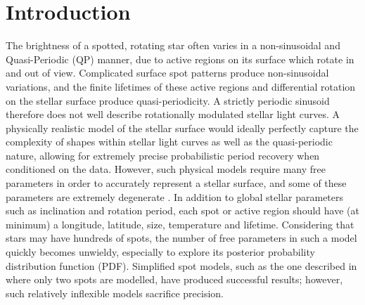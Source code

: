\documentclass[useAMS, usenatbib, preprint, 12pt]{aastex}
\newcommand{\eg}{{\it e.g.}}
\begin{document}
\section{Introduction}

The brightness of a spotted, rotating star often varies in a non-sinusoidal and
Quasi-Periodic (QP) manner, due to active regions on its surface which
rotate in and out of view.
Complicated surface spot patterns produce non-sinusoidal variations,
and the finite lifetimes of these active regions and
differential rotation on the stellar surface produce quasi-periodicity.
A strictly periodic sinusoid therefore does not well describe
rotationally modulated stellar light curves.
A physically realistic model of the stellar surface
would ideally perfectly capture the complexity of shapes
within stellar light curves as well as the quasi-periodic nature, allowing for
extremely precise probabilistic period recovery when conditioned on the data.
However, such physical models require many free parameters in order to
accurately represent a stellar surface, and some of these parameters are
extremely degenerate \citep[\eg][]{Russell1906, Jeffers2009, Kipping2012}.
In addition to global stellar parameters such as inclination and rotation
period, each spot or active region should have (at minimum) a longitude,
latitude, size, temperature and lifetime.
Considering that stars may have hundreds of spots, the number
of free parameters in such a model quickly becomes unwieldy, especially to explore
its posterior probability distribution function (PDF).
Simplified spot models, such as the one described in \citet{Lanza2014} where
only two spots are modelled, have produced successful results; however, such
relatively inflexible models sacrifice precision.
\end{document}

